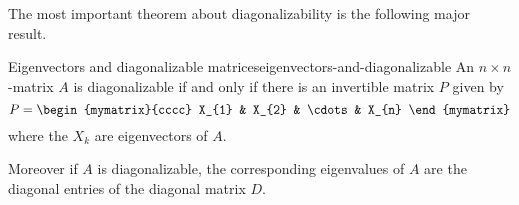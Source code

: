 The most important theorem about diagonalizability is the following
major result.

\begin{theorem}{Eigenvectors and diagonalizable matrices}{eigenvectors-and-diagonalizable}
  An $n\times n$-matrix $A$ is diagonalizable if and only if there is
  an invertible matrix $P$ given by
  \begin{equation*}
    P=\begin{mymatrix}{cccc}
      X_{1} & X_{2} & \cdots & X_{n}
    \end{mymatrix}
  \end{equation*}
  where the $X_{k}$ are eigenvectors of $A$.

  Moreover if $A$ is diagonalizable, the corresponding eigenvalues of
  $A$ are the diagonal entries of the diagonal matrix $D$.
\end{theorem}

